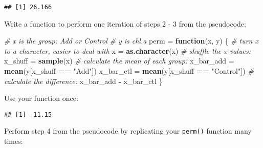 \documentclass[]{book}
\newenvironment{Shaded}{\begin{snugshade}}{\end{snugshade}}
\newcommand{\KeywordTok}[1]{\textcolor[rgb]{0.13,0.29,0.53}{\textbf{#1}}}
\newcommand{\DataTypeTok}[1]{\textcolor[rgb]{0.13,0.29,0.53}{#1}}
\newcommand{\DecValTok}[1]{\textcolor[rgb]{0.00,0.00,0.81}{#1}}
\newcommand{\StringTok}[1]{\textcolor[rgb]{0.31,0.60,0.02}{#1}}
\newcommand{\CommentTok}[1]{\textcolor[rgb]{0.56,0.35,0.01}{\textit{#1}}}
\newcommand{\ControlFlowTok}[1]{\textcolor[rgb]{0.13,0.29,0.53}{\textbf{#1}}}
\newcommand{\OperatorTok}[1]{\textcolor[rgb]{0.81,0.36,0.00}{\textbf{#1}}}
\newcommand{\NormalTok}[1]{#1}
\theoremstyle{definition}
\theoremstyle{definition}
\theoremstyle{definition}
\theoremstyle{remark}
\begin{document}
\begin{verbatim}
## [1] 26.166
\end{verbatim}

Write a function to perform one iteration of steps 2 - 3 from the
pseudocode:

\begin{Shaded}
\begin{Highlighting}[]
\CommentTok{# x is the group: Add or Control}
\CommentTok{# y is chl.a}
\NormalTok{perm =}\StringTok{ }\ControlFlowTok{function}\NormalTok{(x, y) \{}
  \CommentTok{# turn x to a character, easier to deal with}
\NormalTok{  x =}\StringTok{ }\KeywordTok{as.character}\NormalTok{(x)}
  \CommentTok{# shuffle the x values:}
\NormalTok{  x_shuff =}\StringTok{ }\KeywordTok{sample}\NormalTok{(x)}
  \CommentTok{# calculate the mean of each group:}
\NormalTok{  x_bar_add =}\StringTok{ }\KeywordTok{mean}\NormalTok{(y[x_shuff }\OperatorTok{==}\StringTok{ "Add"}\NormalTok{])}
\NormalTok{  x_bar_ctl =}\StringTok{ }\KeywordTok{mean}\NormalTok{(y[x_shuff }\OperatorTok{==}\StringTok{ "Control"}\NormalTok{])}
  \CommentTok{# calculate the difference:}
\NormalTok{  x_bar_add }\OperatorTok{-}\StringTok{ }\NormalTok{x_bar_ctl}
\NormalTok{\}}
\end{Highlighting}
\end{Shaded}

Use your function once:

\begin{Shaded}
\end{Shaded}

\begin{verbatim}
## [1] -11.15
\end{verbatim}

Perform step 4 from the pseudocode by replicating your \texttt{perm()}
function many times:

\begin{Shaded}
\end{Shaded}
\end{document}
